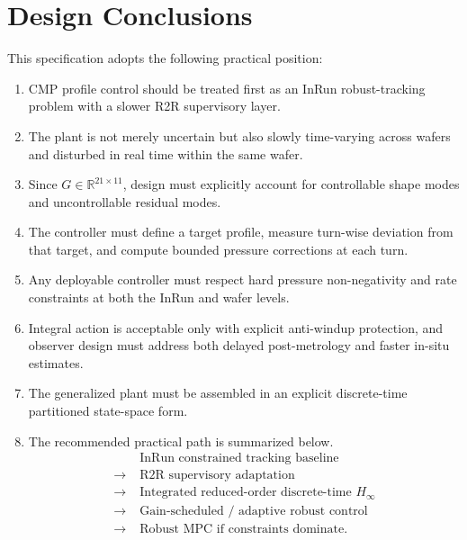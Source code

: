 \documentclass[11pt,a4paper]{article}
\newcommand{\R}{\mathbb{R}}
\begin{document}
\section{Design Conclusions}
This specification adopts the following practical position:
\begin{enumerate}[leftmargin=1.7em]
\item CMP profile control should be treated first as an InRun robust-tracking problem with a slower R2R supervisory layer.
\item The plant is not merely uncertain but also slowly time-varying across wafers and disturbed in real time within the same wafer.
\item Since $G\in\R^{21\times 11}$, design must explicitly account for controllable shape modes and uncontrollable residual modes.
\item The controller must define a target profile, measure turn-wise deviation from that target, and compute bounded pressure corrections at each turn.
\item Any deployable controller must respect hard pressure non-negativity and rate constraints at both the InRun and wafer levels.
\item Integral action is acceptable only with explicit anti-windup protection, and observer design must address both delayed post-metrology and faster in-situ estimates.
\item The generalized plant must be assembled in an explicit discrete-time partitioned state-space form.
\item The recommended practical path is summarized below.
\begin{align*}
&\text{InRun constrained tracking baseline}\\
\rightarrow\;&\text{R2R supervisory adaptation}\\
\rightarrow\;&\text{Integrated reduced-order discrete-time } H_{\infty}\\
\rightarrow\;&\text{Gain-scheduled / adaptive robust control}\\
\rightarrow\;&\text{Robust MPC if constraints dominate.}
\end{align*}
\end{enumerate}

\appendix
\end{document}
